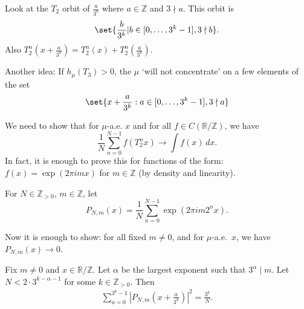 \documentclass{article}
\begin{document}
\begin{remark}
  Look at the $T_2$ orbit of $\frac{a}{3^k}$ where $a \in \mathbb{Z}$ and $3 \nmid a$. This orbit is
  \begin{equation*}
    \set{\frac{b}{3^k} | b \in [0, \dotsc, 3^k-1], 3 \nmid b}.
  \end{equation*}
  Also $T_2^n(x+\frac{a}{3^k}) = T_2^n(x) + T_2^n(\frac{a}{3^k})$.

  Another idea: If $h_\mu(T_3) > 0$, the $\mu$ `will not concentrate' on a few elements of the set
  \begin{equation*}
    \set{x + \frac{a}{3^k} : a \in [0, \dotsc, 3^k-1], 3 \nmid a}
  \end{equation*}
\end{remark}

We need to show that for $\mu$-a.e. $x$ and for all $f \in C(\mathbb{R}/\mathbb{Z})$, we have
\begin{equation*}
  \frac{1}{N} \sum_{n=0}^{N-1} f(T_2^n x) \to \int f(x) \, dx.
\end{equation*}
In fact, it is enough to prove this for functions of the form: $f(x) = \exp(2\pi i m x)$ for $m \in \mathbb{Z}$ (by density and linearity).
\begin{notation}
  For $N \in \mathbb{Z}_{>0}$, $m \in \mathbb{Z}$, let
  \begin{equation*}
    P_{N,m}(x) = \frac{1}{N} \sum_{n=0}^{N-1} \exp(2 \pi i m 2^n x).
  \end{equation*}
\end{notation}
Now it is enough to show: for all fixed $m \neq 0$, and for $\mu$-a.e.\ $x$, we have $P_{N,m}(x) \to 0$.
\begin{lemma}
  Fix $m \neq 0$ and $x \in \mathbb{R}/\mathbb{Z}$.
  Let $\alpha$ be the largest exponent such that $3^\alpha \mid m$.
  Let $N < 2 \cdot 3^{k-\alpha-1}$ for some $k \in \mathbb{Z}_{>0}$.
  Then
  \begin{align*}
    \sum_{a=0}^{3^k-1} \left|P_{N,m}(x+\frac{a}{3^k})\right|^2 = \frac{3^k}{N}.
  \end{align*}
\end{lemma}
\end{document}

